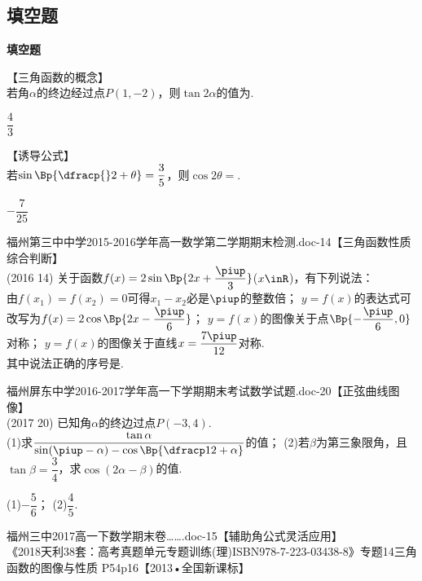   \subsection{填空题}
  \begin{exercise}{\bf 填空题}
    \item 【三角函数的概念】\\
      若角$\alpha$的终边经过点$P(1,-2)$，则$\tan{2\alpha}$的值为\tk.
      \begin{answer}
        $\dfrac43$
      \end{answer}
    \item 【诱导公式】\\
      若$\sin\Bp{\dfracp{}2+\theta}=\dfrac35$，则$\cos{2\theta}=$\tk.
      \begin{answer}
        $-\dfrac7{25}$
      \end{answer}
    \item 福州第三中中学2015-2016学年高一数学第二学期期末检测.doc-14【三角函数性质 综合判断】\\
      (2016  14)
      关于函数$f(x)=2\sin\Bp{2x+\dfrac{\piup}3}$($x\inR$)，有下列说法：\\
      由$f(x_1)=f(x_2)=0$可得$x_1-x_2$必是$\piup$的整数倍；
      $y=f(x)$的表达式可改写为$f(x)=2\cos\Bp{2x-\dfrac{\piup}6}$；
      $y=f(x)$的图像关于点$\Bp{-\dfrac{\piup}6,0}$对称；
      $y=f(x)$的图像关于直线$x=\dfrac{7\piup}{12}$对称.\\
      其中说法正确的序号是\tk.
      \begin{answer}
      \end{answer}
    \item 福州屏东中学2016-2017学年高一下学期期末考试数学试题.doc-20【正弦曲线图像】\\
      (2017  20)
      已知角$\alpha$的终边过点$P(-3,4)$.\\
      (1)求$\dfrac{\tan\alpha}{\sin(\piup-\alpha)-\cos\Bp{\dfracp12+\alpha}}$的值；\quad
      (2)若$\beta$为第三象限角，且$\tan\beta=\dfrac34$，求$\cos(2\alpha-\beta)$的值.
      \begin{answer}
        (1)$-\dfrac56$；
        (2)$\dfrac45$.
      \end{answer}
    \item 福州三中2017高一下数学期末卷…….doc-15【辅助角公式灵活应用】\\
         《2018天利38套：高考真题单元专题训练(理)ISBN978-7-223-03438-8》专题14三角函数的图像与性质 P54p16【2013•全国新课标】\\

\end{exercise}
